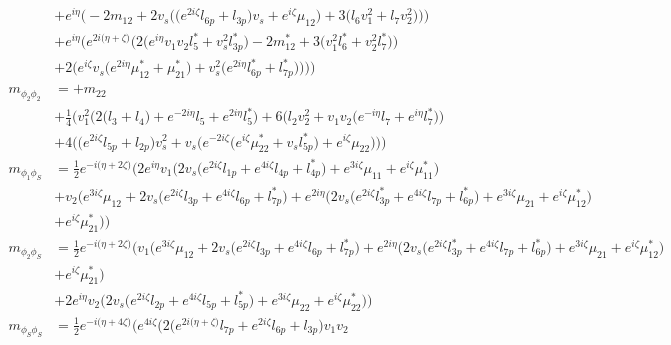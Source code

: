 \begin{itemize}
\begin{align}
 &+e^{i \eta } \Big(-2 m_{12}  + 2 v_s \Big(\Big(e^{2 i \zeta } l_{6p}  + l_{3p}\Big)v_s  + e^{i \zeta } \mu_{12} \Big) + 3 \Big(l_6 v_{1}^{2}  + l_7 v_{2}^{2} \Big)\Big)\Big)\nonumber \\ 
 &+e^{i \eta } \Big(e^{2 i \Big(\eta +\zeta \Big)} \Big(2 \Big(e^{i \eta } v_1 v_2 l_5^*  + v_{s}^{2} l_{3p}^* \Big) -2 m_{12}^*  + 3 \Big(v_{1}^{2} l_6^*  + v_{2}^{2} l_7^* \Big)\Big)\nonumber \\ 
 &+2 \Big(e^{i \zeta } v_s \Big(e^{2 i \eta } \mu_{12}^*  + \mu_{21}^*\Big) + v_{s}^{2} \Big(e^{2 i \eta } l_{6p}^*  + l_{7p}^*\Big)\Big)\Big)\Big)\\ 
m_{\phi_2\phi_2} &= +m_{22}\nonumber \\ 
 &+\frac{1}{4} \Big(v_{1}^{2} \Big(2 \Big(l_3 + l_4\Big) + e^{-2 i \eta } l_5  + e^{2 i \eta } l_5^* \Big)+6 \Big(l_2 v_{2}^{2}  + v_1 v_2 \Big(e^{-i \eta } l_7  + e^{i \eta } l_7^* \Big)\Big)\nonumber \\ 
 &+4 \Big(\Big(e^{2 i \zeta } l_{5p}  + l_{2p}\Big)v_{s}^{2}  + v_s \Big(e^{-2 i \zeta } \Big(e^{i \zeta } \mu_{22}^*  + v_s l_{5p}^* \Big) + e^{i \zeta } \mu_{22} \Big)\Big)\Big)\\ 
m_{\phi_1\phi_S} &= \frac{1}{2} e^{-i \Big(\eta +2 \zeta \Big)} \Big(2 e^{i \eta } v_1 \Big(2 v_s \Big(e^{2 i \zeta } l_{1p}  + e^{4 i \zeta } l_{4p}  + l_{4p}^*\Big) + e^{3 i \zeta } \mu_{11}  + e^{i \zeta } \mu_{11}^* \Big)\nonumber \\ 
 &+v_2 \Big(e^{3 i \zeta } \mu_{12} +2 v_s \Big(e^{2 i \zeta } l_{3p}  + e^{4 i \zeta } l_{6p}  + l_{7p}^*\Big)+e^{2 i \eta } \Big(2 v_s \Big(e^{2 i \zeta } l_{3p}^*  + e^{4 i \zeta } l_{7p}  + l_{6p}^*\Big) + e^{3 i \zeta } \mu_{21}  + e^{i \zeta } \mu_{12}^* \Big)\nonumber \\ 
 &+e^{i \zeta } \mu_{21}^* \Big)\Big)\\ 
m_{\phi_2\phi_S} &= \frac{1}{2} e^{-i \Big(\eta +2 \zeta \Big)} \Big(v_1 \Big(e^{3 i \zeta } \mu_{12} +2 v_s \Big(e^{2 i \zeta } l_{3p}  + e^{4 i \zeta } l_{6p}  + l_{7p}^*\Big)+e^{2 i \eta } \Big(2 v_s \Big(e^{2 i \zeta } l_{3p}^*  + e^{4 i \zeta } l_{7p}  + l_{6p}^*\Big) + e^{3 i \zeta } \mu_{21}  + e^{i \zeta } \mu_{12}^* \Big)\nonumber \\ 
 &+e^{i \zeta } \mu_{21}^* \Big)\nonumber \\ 
 &+2 e^{i \eta } v_2 \Big(2 v_s \Big(e^{2 i \zeta } l_{2p}  + e^{4 i \zeta } l_{5p}  + l_{5p}^*\Big) + e^{3 i \zeta } \mu_{22}  + e^{i \zeta } \mu_{22}^* \Big)\Big)\\ 
m_{\phi_S\phi_S} &= \frac{1}{2} e^{-i \Big(\eta +4 \zeta \Big)} \Big(e^{4 i \zeta } \Big(2 \Big(e^{2 i \Big(\eta +\zeta \Big)} l_{7p}  + e^{2 i \zeta } l_{6p}  + l_{3p}\Big)v_1 v_2 \nonumber \\ 

\end{align}
\end{itemize}
